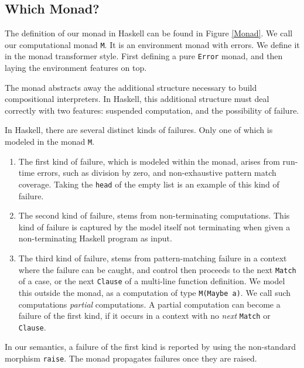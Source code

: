 \documentclass{entcs} \usepackage{entcsmacro}
\begin{document}
\subsection{Which Monad?}

The definition of our monad in Haskell can be found in Figure \ref{Monad}. We call
our computational monad {\tt M}. It is an environment monad with errors. We define
it in the monad transformer style\cite{LiangHudak,LiangThesis,Espinosa95PHD}.
First defining a pure {\tt Error} monad, and then laying the environment features
on top.

The monad abstracts away the additional structure necessary to build compositional
interpreters. In Haskell, this additional structure must deal correctly with two
features: suspended computation, and the possibility of failure.

In Haskell, there are several distinct kinds of failures. Only one of which is
modeled in the monad {\tt M}. 

\begin{enumerate}

\item The first kind of failure, which is modeled within the monad, arises from
      run-time errors, such as division by zero, and non-exhaustive pattern match
      coverage. Taking the {\tt head} of the empty list is an example of this kind
      of failure.

\item The second kind of failure, stems from non-terminating computations. This
      kind of failure is captured by the model itself not terminating when
      given a non-terminating Haskell program as input.

\item The third kind of failure, stems from pattern-matching failure in a context
      where the failure can be caught, and control then proceeds to the next
      {\tt Match} of a case, or the next {\tt Clause} of a multi-line function
      definition. We model this outside the monad, as a computation of type
      {\tt M(Maybe a)}. We call such computations {\em partial} computations.
      A partial computation can become a failure of the first kind, if it occurs
      in a context with no {\em next} {\tt Match} or {\tt Clause}.
\end{enumerate}

In our semantics, a failure of the first kind is reported by using the non-standard
morphism {\tt raise}. The monad propagates failures once they are raised.
\end{document}
